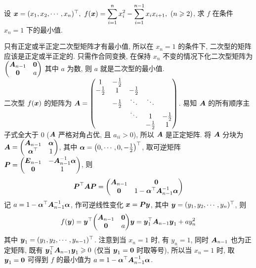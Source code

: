 \begin{example}
    设 $\vb*{x}=(x_1, x_2, \cdots ,x_n)^\top,~f(\vb*{x})=\displaystyle \sum_{i=1}^{n} x_i^2-\sum_{i=1}^{n-1} x_ix_{i+1},~(n\geqslant 2)$, 求 $f$ 在条件 $x_n=1$ 下的最小值.
\end{example}
\begin{solution}
    只有正定或半正定二次型矩阵才有最小值, 所以在 $x_n=1$ 的条件下, 二次型的矩阵应该是正定或半正定的. 只需作合同变换, 在保持 $x_n$ 不变的情况下化二次型矩阵为 $\mqty(\vb*{A}_{n-1}& \vb*{0}\\ \vb*{0}& a)$ 其中 $a$ 为数, 则 $a$ 就是二次型的最小值.\\ 
    二次型 $f(\vb*{x})$ 的矩阵为 $\vb*{A}=\begin{pmatrix} 1 & -\frac{1}{2} &  &  &  \\ -\frac{1}{2} & 1 & -\frac{1}{2} &  &  \\  & -\frac{1}{2} & \ddots & \ddots &  \\  &  & \ddots & 1 & -\frac{1}{2}  \\  &  &  & -\frac{1}{2}  & 1 \\\end{pmatrix}$. 易知 $\vb*{A}$ 的所有顺序主子式全大于 $0$ ($\vb*{A}$ 严格对角占优, 且 $a_{ii}>0$), 所以 $\vb*{A}$ 是正定矩阵. 
    将 $\vb*{A}$ 分块为 $\vb*{A}=\mqty(\vb*{A}_{n-1}& \vb*{\alpha} \\ \vb*{\alpha}^\top & 1)$, 其中 $\vb*{\alpha}=\qty(0, \cdots ,0,-\frac{1}{2})^\top$, 取可逆矩阵 $\vb*{P}=\mqty(\vb*{E}_{n-1}& -\vb*{A}_{n-1}^{-1}\vb*{\alpha}\\ \vb*{0} & 1)$, 则
    $$
    \vb*{P}^\top\vb*{AP}=\mqty(\vb*{A}_{n-1}& \vb*{0}\\ \vb*{0}& 1-\vb*{\alpha}^\top\vb*{A}_{n-1}^{-1}\vb*{\alpha})
    $$
    记 $a=1-\vb*{\alpha}^\top\vb*{A}_{n-1}^{-1}\vb*{\alpha}$, 作可逆线性变化 $\vb*{x}=\vb*{Py}$, 其中 $\vb*{y}=(y_1, y_2, \cdots , y_n)^\top$, 则 
    $$
    f(\vb*{y})=\vb*{y}^\top\mqty(\vb*{A}_{n-1}& \vb*{0}\\ \vb*{0}& a)\vb*{y}=\vb*{y}_1^\top\vb*{A}_{n-1}\vb*{y}_1+ay_n^2
    $$
    其中 $\vb*{y}_1=(y_1, y_2, \cdots , y_{n-1})^\top$. 注意到当 $x_n=1$ 时, 有 $y_n=1$, 同时 $\vb*{A}_{n-1}$ 也为正定矩阵, 既有 $\vb*{y}_1^\top\vb*{A}_{n-1}\vb*{y}_1\geqslant 0$ (仅当 $\vb*{y}_1=\vb*{0}$ 时取等号), 所以当 $x_n=1$ 时, 取 $\vb*{y}_1=\vb*{0}$ 可得到 $f$ 的最小值为 $a=1-\vb*{\alpha}^\top\vb*{A}_{n-1}^{-1}\vb*{\alpha}$.
\end{solution}

